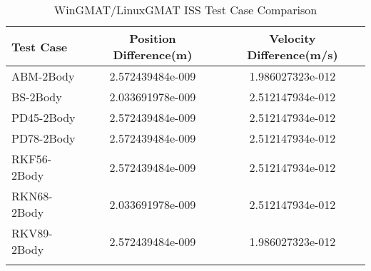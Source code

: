\begin{table}[htbp!]
\centering
\caption{ WinGMAT/LinuxGMAT ISS Test Case Comparison}
      \begin{tabular}{lcc}
      \hline\hline
          Test Case & Position Difference(m) & Velocity Difference(m/s) \\
         \hline
         ABM-2Body & 2.572439484e-009 & 1.986027323e-012 \\
         BS-2Body & 2.033691978e-009 & 2.512147934e-012 \\
         PD45-2Body & 2.572439484e-009 & 2.512147934e-012 \\
         PD78-2Body & 2.572439484e-009 & 2.512147934e-012 \\
         RKF56-2Body & 2.572439484e-009 & 2.512147934e-012 \\
         RKN68-2Body & 2.033691978e-009 & 2.512147934e-012 \\
         RKV89-2Body & 2.572439484e-009 & 1.986027323e-012 \\
      \hline\hline
      \label{Table: ISS WinGMAT-LinuxGMAT Table} 
\end{tabular}
\end{table}
